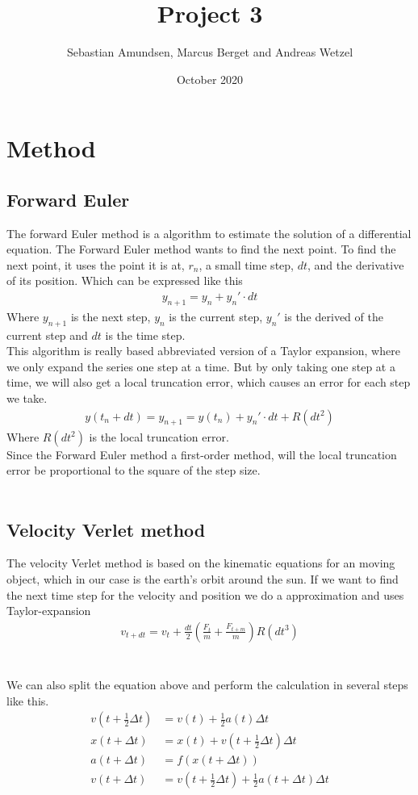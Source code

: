 \documentclass[norsk,a4paper,12pt]{article}
\title{Project 3}
\author{Sebastian Amundsen, Marcus Berget and Andreas Wetzel}
\date{October 2020}
\begin{document}
\maketitle

\section{Method}
\subsection{Forward Euler}
The forward Euler method is a algorithm to estimate the solution of a differential equation. The Forward Euler method wants to find the next point. To find the next point, it uses the point it is at, $r_n$, a small time step, $dt$, and the derivative of its position. Which can be expressed like this
\begin{align}
    y_{n+1}=y_n + y_n'\cdot dt
\end{align}
Where $y_{n+1}$ is the next step, $y_n$ is the current step, $y_n'$ is the derived of the current step and $dt$ is the time step.\\
This algorithm is really based abbreviated version of a Taylor expansion, where we only expand the series one step at a time. But by only taking one step at a time, we will also get a local truncation error, which causes an error for each step we take. \begin{align}
    y(t_n+dt)=y_{n+1}=y(t_n)+y_n'\cdot dt + R(dt^2)
\end{align} 
Where $R(dt^2)$ is the local truncation error. \\
Since the Forward Euler method a first-order method, will the local truncation error be proportional to the square of the step size. 
\\
\\
\subsection{Velocity Verlet method}
The velocity Verlet method is based on the kinematic equations for an moving object, which in our case is the earth's orbit around the sun. If we want to find the next time step for the velocity and position we do a approximation and uses Taylor-expansion   
\begin{align}
    v_{t+dt}=v_t +\frac{dt}{2}(\frac{F_t}{m}+\frac{F_{t+m}}{m}) R(dt^3)
\end{align}\\
\\
We can also split the equation above and perform the calculation in several steps like this.
\begin{align}
    v(t+\frac{1}{2}\Delta t)&=v(t)+\frac{1}{2}a(t)\Delta t\\
    x(t+\Delta t)&=x(t)+v(t+\frac{1}{2}\Delta t)\Delta t\\
    a(t+\Delta t)&=f(x(t+\Delta t))\\
    v(t+\Delta t)&=v(t+\frac{1}{2}\Delta t)+\frac{1}{2}a(t+\Delta t)\Delta t
\end{align}
\\
\\
\end{document}

